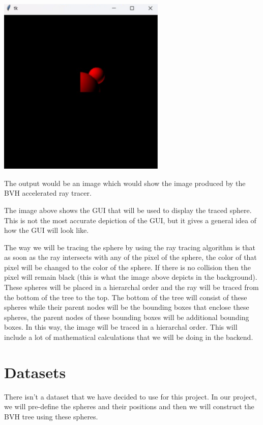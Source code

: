 \documentclass{article}
\begin{document}
\begin{center}
  \includegraphics*[width = 8cm]{gui.png}
\end{center}

The output would be an image which would show the image produced by the BVH accelerated ray tracer.

The image above shows the GUI that will be used to display the traced sphere. This is not the most accurate depiction of the GUI, but it gives a general idea of how the GUI will look like.

The way we will be tracing the sphere by using the ray tracing algorithm is that as soon as the ray intersects with any of the pixel of the sphere, the color of that pixel will be changed to the color of the sphere.
If there is no collision then the pixel will remain black (this is what the image above depicts in the background). These spheres will be placed in a hierarchal order and the ray will be traced from the bottom of the tree
to the top. The bottom of the tree will consist of these spheres while their parent nodes will be the bounding boxes that enclose these spheres, the parent nodes of these
bounding boxes will be additional bounding boxes. In this way, the image will be traced in a hierarchal order. This will
include a lot of mathematical calculations that we will be doing in the backend.

\section{Datasets}

There isn't a dataset that we have decided to use for this project. In our project, we will pre-define the spheres and their positions and then we will construct the BVH tree using these spheres.
\end{document}
